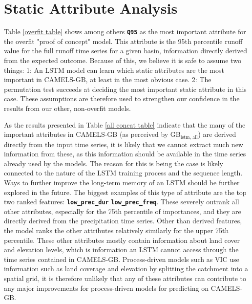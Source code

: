 \section{Static Attribute Analysis}
\label{discuss static attributes}
Table \ref{overfit table} shows among others \textbf{\texttt{Q95}} as the most 
important attribute for the overfit "proof of concept" model. This attribute is the 
95th percentile runoff value for the full runoff time series for a given basin, 
information directly derived from the expected outcome. 
Because of this, we believe it is 
safe to assume two things: 1: An LSTM model can learn which static attributes are 
the most important in CAMELS-GB, at least in the most obvious case. 2: The permutation test 
succeeds at deciding the most important static attribute in this case. These 
assumptions are therefore used to strengthen our confidence in the results from 
our other, non-overfit models. 

As the results presented in Table \ref{all concat table}
indicate that the many of the important attributes in CAMELS-GB (as perceived by 
GB$_\text{lstm, all}$) are derived directly from the 
input time series, it is likely that we cannot extract much new information from 
these, as this information should be available in the time series already used by 
the models. The reason for this is being the case is likely connected to the 
nature of the LSTM training process and the sequence length. Ways 
to further improve the long-term memory of an LSTM should be further explored 
in the future. The biggest examples of this type of attribute are the top two ranked 
features: \textbf{\texttt{low\_prec\_dur}} \textbf{\texttt{low\_prec\_freq}}. 
These severely outrank all other attributes, especially for the 75th percentile 
of importances, and they are directly derived from the precipitation time series.
Other than derived features, the model ranks the other attributes relatively similarly 
for the upper 75th percentile. These other attributes mostly contain information 
about land cover and elevation levels, which is information an LSTM cannot access 
through the time series contained in CAMELS-GB. Process-driven models such as VIC 
use information such as land coverage and elevation by splitting the catchment 
into a spatial grid, it is therefore unlikely that any of these attributes can 
contribute to any major improvements for process-driven models for predicting 
on CAMELS-GB.

